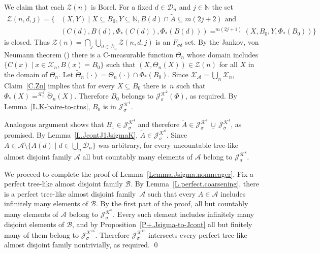 \documentclass{amsart}
\makeatletter
\def\text{\mbox}
\theoremstyle{definition}
\theoremstyle{remark}
\newcommand{\ucup}{\,\underline{\cup}\,}
\newcommand{\Jsigma}{\cJ_\sigma}
\newcommand{\cK}{{\mathcal K}}
\renewcommand{\proofname}{Proof}
\renewenvironment{proof}[1][\proofname]{\par
\let\oldqedsymbol\qedsymbol             %
  \normalfont
  \topsep6\p@\@plus6\p@ \trivlist
  \item[\hskip\labelsep\hskip\parindent\scshape
    #1\@addpunct{.}]\ignorespaces
}{%
  \qed\endtrivlist
\global\let\qedsymbol\oldqedsymbol      %
}
\newcommand{\bbN}{\mathbb N}
\newcommand{\cJ}{{\mathcal J}} %
\newcommand{\cA}{\mathcal A}
\newcommand{\cX}{\mathcal X}
\newcommand{\cZ}{\mathcal Z}
\newcommand{\calD}{{\mathcal D}}
\newcommand{\cB}{\mathcal B}
\numberwithin{claim}{subsection}
\makeatother
\begin{document}
\begin{proof}
We claim that each  $\cZ(n)$ is Borel. For a fixed $d\in\calD_n$  and $j\in \bbN$ the set  
\begin{align*}
\cZ(n,d,j)=
\{&(X,Y)\mid X\subseteq B_0, Y\subseteq \bbN, B(d)\cap \tilde A\subseteq m(2j+2)\text{ and }\\
&(C(d), B(d), \Phi_*(C(d)), \Phi_*(B(d)))=^{m(2j+1)} 
(X, B_0, Y, \Phi_*(B_0))\}
\end{align*}
is closed. Thus $\cZ(n)=\bigcap_j \bigcup_{d\in \calD_n} \cZ(n,d,j)$ is an $F_{\sigma\delta}$ set. By the Jankov, von Neumann theorem (\cite[18.A]{Ke:Classical}) there is a C-measurable function $\Theta_n$ whose domain includes  $\{C(x)\mid x\in \cX_n, B(x)=B_0\}$ such that  $(X,\Theta_n(X))\in \cZ(n)$ for all $X$ in the domain of $\Theta_n$.  
Let $\tilde \Theta_n(\cdot)=\Theta_n(\cdot)\cap \Phi_*(B_0)$.  
Since $\cX_\cA=\bigcup_n \cX_n$, Claim~\ref{C.Zn} implies that for every $X\subseteq B_0$ there is~$n$ such that $\Phi_*(X)=^{\cK_n^2} \tilde \Theta_n(X)$. Therefore $B_0$ belongs to $\Jsigma^{\cK^2}(\Phi)$, as required.  
By Lemma~\ref{L.K-baire-to-ctns}, $B_0$ is in $\Jsigma^{\cK^4}$. 

Analogous argument shows that $B_1\in \Jsigma^{\cK^4}$ and therefore $\tilde A\in \Jsigma^{\cK^4}\ucup \Jsigma^{\cK^4}$, as promised. By Lemma~\ref{L.JcontJ1JsigmaK}, $\tilde A\in \Jsigma^{\cK^8}$. 
 Since $\tilde A\in \cA\setminus \{A(d)\mid d\in \bigcup_n \calD_n\}$ was arbitrary, for every uncountable tree-like almost disjoint family $\cA$ all but countably many elements of $\cA$ belong to $\Jsigma^{\cK^8}$. 

We proceed to complete the proof of Lemma~\ref{Lemma.Jsigma.nonmeager}.  Fix a perfect tree-like almost disjoint family $\cB$. By Lemma~\ref{L.perfect.coarsening},  there is a perfect tree-like almost disjoint family~$\cA$ such that every $A\in \cA$ includes infinitely many elements of $\cB$. 
 By the first part of the proof,  all but countably many elements of $\cA$  belong to $\Jsigma^{\cK^8}$. 
 Every such element includes infinitely many disjoint elements of $\cB$, and by Proposition~\ref{P+.Jsigma-to-Jcont} all but finitely many of them belong to $\Jsigma^{\cK^{16}}$. 	Therefore $\Jsigma^{\cK^{16}}$  intersects every perfect tree-like almost disjoint family nontrivially, as required. 
 \end{proof}
\end{document}
